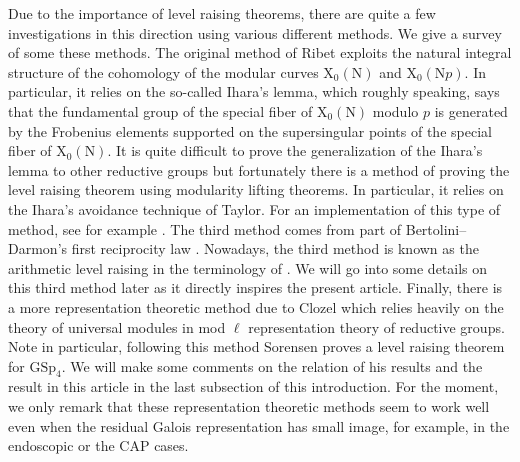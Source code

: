 \documentclass[10pt]{amsart}
\numberwithin{equation}{section}
\theoremstyle{definition}
\def\GSp{\mathrm{GSp}}
\def\rmN{\mathrm{N}}
\def\rmX{\mathrm{X}}
\begin{document}
Due to the importance of level raising theorems, there are quite a few investigations in this direction using various different methods. We give a survey of some these methods. The original method of Ribet exploits the natural integral structure of the cohomology of the modular curves $\rmX_{0}(\rmN)$ and $\rmX_{0}(\rmN p)$. In particular, it relies on the so-called Ihara's lemma, which roughly speaking, says that the fundamental group of the special fiber of $\rmX_{0}(\rmN)$ modulo $p$ is generated by the Frobenius elements supported on the supersingular points of the special fiber of $\rmX_{0}(\rmN)$. It is quite difficult to prove the generalization of the Ihara's lemma to other reductive groups but fortunately there is a method of proving the level raising theorem using modularity lifting theorems. In particular, it relies on the Ihara's avoidance technique of Taylor. For an implementation of this type of method, see for example \cite{Gee11}.  The third method comes from part of Bertolini--Darmon's first reciprocity law \cite[Theorem 5.15, Corollary 5.18]{BD-Main}. Nowadays, the third method is known as the arithmetic level raising in the terminology of \cite{LTXZZ}. We will go into some details on this third method later as it directly inspires the present article. Finally, there is a more representation theoretic method due to Clozel \cite{Clo} which relies heavily on the theory of universal modules in mod $\ell$ representation theory of reductive groups. Note in particular, following this method Sorensen \cite{Sor-level-raising} proves a level raising theorem for $\GSp_{4}$. We will make some comments on the relation of his results and the result in this article in the last subsection of this introduction. For the moment, we only remark that these representation theoretic methods seem to work well even when the residual Galois representation has small image, for example, in the endoscopic or the CAP cases. 
\end{document}
